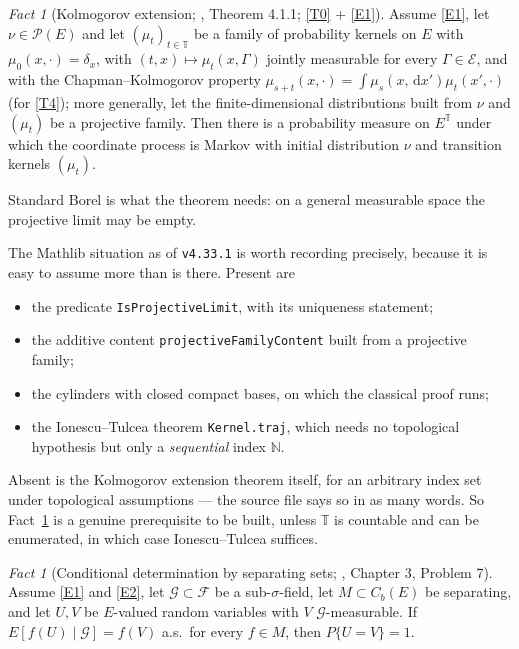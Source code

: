 \documentclass[11pt,a4paper]{article}
\theoremstyle{plain}
\theoremstyle{definition}
\theoremstyle{remark}
\newtheorem{fact}[theorem]{Fact}
\newcommand{\N}{\mathbb{N}}
\newcommand{\T}{\mathbb{T}}                     %
\newcommand{\Cb}{C_b}                          %
\newcommand{\Prob}{\mathcal{P}}                %
\newcommand{\Filt}{\mathcal{F}}
\newcommand{\Gilt}{\mathcal{G}}
\newcommand{\dif}{\,\mathrm{d}}
\newcommand{\EK}{\cite{EK86}}
\begin{document}
\begin{fact}[Kolmogorov extension; \EK, Theorem 4.1.1; \eqref{T0} + \eqref{E1}]
  \label{fact:kolmogorov}
  Assume \eqref{E1}, let $\nu \in \Prob(E)$ and let $(\mu_t)_{t \in \T}$ be a family of
  probability kernels on $E$ with $\mu_0(x,\cdot) = \delta_x$, with
  $(t,x) \mapsto \mu_t(x,\Gamma)$ jointly measurable for every
  $\Gamma \in \mathcal{E}$, and with the Chapman--Kolmogorov property
  $\mu_{s+t}(x,\cdot) = \int \mu_s(x,\dif x')\mu_t(x',\cdot)$ (for \eqref{T4}); more
  generally, let the finite-dimensional distributions built from $\nu$ and
  $(\mu_t)$ be a projective family.  Then there is a probability measure on
  $E^{\T}$ under which the coordinate process is Markov with initial distribution
  $\nu$ and transition kernels $(\mu_t)$.

  Standard Borel is what the theorem needs: on a general measurable space the
  projective limit may be empty.

  The Mathlib situation as of \texttt{v4.33.1} is worth recording precisely,
  because it is easy to assume more than is there.  Present are
  \begin{itemize}[nosep]
  \item the predicate \texttt{IsProjectiveLimit}, with its uniqueness
    statement;
  \item the additive content \texttt{projectiveFamilyContent} built from a
    projective family;
  \item the cylinders with closed compact bases, on which the classical proof
    runs;
  \item the Ionescu--Tulcea theorem \texttt{Kernel.traj}, which needs no
    topological hypothesis but only a \emph{sequential} index $\N$.
  \end{itemize}
  Absent is the Kolmogorov extension theorem itself, for an arbitrary index set
  under topological assumptions --- the source file says so in as many words.  So
  Fact~\ref{fact:kolmogorov} is a genuine prerequisite to be built, unless $\T$ is
  countable and can be enumerated, in which case Ionescu--Tulcea suffices.
\end{fact}

\begin{fact}[Conditional determination by separating sets; \EK, Chapter 3, Problem 7]
  \label{fact:sepcond}
  Assume \eqref{E1} and \eqref{E2}, let $\Gilt \subset \Filt$ be a sub-$\sigma$-field, let $M \subset \Cb(E)$ be
  separating, and let $U,V$ be $E$-valued random variables with $V$
  $\Gilt$-measurable.  If $E[f(U) \mid \Gilt] = f(V)$ a.s.\ for every $f \in M$,
  then $P\{U = V\} = 1$.
\end{fact}
\end{document}
